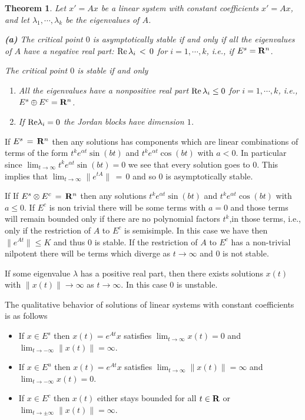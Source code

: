 \documentclass[12pt]{report}
\newcommand{\bR}{{\bf R}}
\newtheorem{theorem}{Theorem}[section]
\newcommand{\proof}{\noindent {\em Proof:~}}
\def\qed{\hbox{\hskip 6pt\vrule width6pt height7pt depth1pt
    \hskip1pt}\bigskip}
\def\to{\rightarrow}
\begin{document}
\begin{theorem} Let $x'=Ax$ be a linear system with constant coefficients  
$x'=Ax$, and let  $\lambda_1, \cdots, \lambda_k$ be the eigenvalues of $A$. 

\noindent
{\bf (a)} The critical point $0$ is asymptotically stable if and only
if all the eigenvalues of $A$ have a negative real part: ${\rm Re}\,
\lambda_i \,< \, 0$ for $ i=1, \cdots, k$, i.e., if $E^{s} =\bR^n$.  

 The critical point $0$ is stable if and only
\begin{enumerate} 
\item All the eigenvalues have a nonpositive real part ${\rm Re}\,
\lambda_i \le 0$ for $ i=1, \cdots, k$, i.e., $E^{s} \oplus E^c = \bR^n$. 
\item If ${\rm Re} \lambda_i = 0$ the Jordan blocks have dimension $1$. 
\end{enumerate}
\end{theorem}

\proof   If $E^{s}\,=\, \bR^n$ then any solutions has components which are linear 
combinations of terms of the form $t^k e^{\alpha t} \sin(bt)$ and $t^k e^{\alpha t} \cos(bt)$
with $a<0$. In particular since $\lim_{t \to \infty} t^k e^{\alpha t} \sin(bt)=0$ we see that 
every solution goes to $0$.  This implies that  $\lim_{t \to \infty} \| e^{tA}\| \,=\, 0$ and so $0$ is asymptotically stable. 
 
  
 If  If $E^{s}\otimes E^{c}\,=\, \bR^n$ then any solutions  $t^k e^{\alpha t} \sin(bt)$ and 
 $t^k e^{\alpha t} \cos(bt)$ with $a \le 0$.  If $E^c$ is non trivial there will be some terms 
 with $a=0$ and those terms will remain bounded only if there are no polynomial factors 
 $t^k$,in those terms,  i.e., only if the restriction of $A$ to $E^c$ is semisimple.  In this case 
 we have then $\|e^{At}\| \le K$  and thus $0$ is stable. 
 If the restriction of $A$ to $E^c$ has a non-trivial nilpotent there will be terms 
 which diverge as $t \to \infty$ and $0$ is not stable.  

If some eigenvalue $\lambda$ has a positive real part, then there exists 
solutions $x(t)$ with $\|x(t)\|\to \infty$ as $t \to \infty$. In this case $0$ is unstable. 
\hfill \qed


The qualitative behavior of solutions of linear
systems with constant coefficients is as follows
\begin{itemize}   
\item If $x \in E^s$ then $x(t) =e^{At} x$ satisfies
$\lim_{t\to\infty} x(t) =0$ and $\lim_{t \to -\infty} \|x(t)\| =
\infty$.
\item If $x \in E^u$ then $x(t) =e^{At} x$ satisfies
$\lim_{t\to\infty} \|x(t)\| =\infty$ and $\lim_{t\to-\infty} x(t) =0$.
\item If $x \in E^c$ then $x(t)$ either stays bounded for all $t \in
\bR$ or $\lim_{t\to \pm \infty} \|x(t)\| =\infty$.
\end{itemize}
\end{document}
